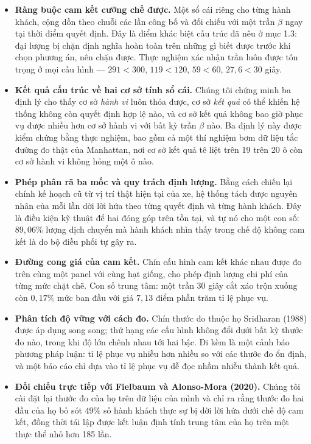 \begin{itemize}[leftmargin=1.2cm,itemsep=3pt,topsep=4pt]
\item \textbf{Ràng buộc cam kết cưỡng chế được.} Một sổ cái riêng cho từng hành khách, cộng dồn
theo chuỗi các lần công bố và đối chiếu với một trần $\beta$ ngay tại thời điểm quyết định.
Đây là điểm khác biệt cấu trúc đã nêu ở mục 1.3: đại lượng bị chặn định nghĩa hoàn toàn trên
những gì biết được trước khi chọn phương án, nên chặn được. Thực nghiệm xác nhận trần luôn được
tôn trọng ở mọi cấu hình --- $291 < 300$, $119 < 120$, $59 < 60$, $27{,}6 < 30$ giây.

\item \textbf{Kết quả cấu trúc về hai cơ sở tính sổ cái.} Chúng tôi chứng minh ba định lý cho
thấy cơ sở \emph{hành vi} luôn thỏa được, cơ sở \emph{kết quả} có thể khiến hệ thống không còn
quyết định hợp lệ nào, và cơ sở kết quả không bao giờ phục vụ được nhiều hơn cơ sở hành vi với
bất kỳ trần $\beta$ nào. Ba định lý này được kiểm chứng bằng thực nghiệm, bao gồm cả một thí
nghiệm bơm dữ liệu tắc đường đo thật của Manhattan, nơi cơ sở kết quả tê liệt trên 19 trên 20 ô
còn cơ sở hành vi không hỏng một ô nào.

\item \textbf{Phép phân rã ba mốc và quy trách định lượng.} Bằng cách chiếu lại chính kế hoạch
cũ từ vị trí thật hiện tại của xe, hệ thống tách được nguyên nhân của mỗi lần dời lời hứa theo
từng quyết định và từng hành khách. Đây là điều kiện kỹ thuật để hai đóng góp trên tồn tại, và
tự nó cho một con số: $89{,}06\%$ lượng dịch chuyển mà hành khách nhìn thấy trong chế độ không
cam kết là do bộ điều phối tự gây ra.

\item \textbf{Đường cong giá của cam kết.} Chín cấu hình cam kết khác nhau được đo trên cùng
một panel với cùng hạt giống, cho phép định lượng chi phí của từng mức chặt chẽ. Con số trung
tâm: một trần 30 giây cắt xáo trộn xuống còn $0{,}17\%$ mức ban đầu với giá $7{,}13$ điểm phần
trăm tỉ lệ phục vụ.

\item \textbf{Phân tích độ vững với cách đo.} Chín thước đo thuộc họ Sridharan (1988) được áp
dụng song song; thứ hạng các cấu hình không đổi dưới bất kỳ thước đo nào, trong khi độ lớn
chênh nhau tới hai bậc. Đi kèm là một cảnh báo phương pháp luận: tỉ lệ phục vụ nhiễu hơn nhiều
so với các thước đo ổn định, và một báo cáo chỉ dựa vào tỉ lệ phục vụ dễ đọc nhầm nhiễu thành
kết quả.

\item \textbf{Đối chiếu trực tiếp với Fielbaum và Alonso-Mora (2020).} Chúng tôi cài đặt lại
thước đo của họ trên dữ liệu của mình và chỉ ra rằng thước đo hai đầu của họ bỏ sót $49\%$ số
hành khách thực sự bị dời lời hứa dưới chế độ cam kết, đồng thời tái lập được kết luận định
tính trung tâm của họ trên một thực thể nhỏ hơn 185 lần.
\end{itemize}

